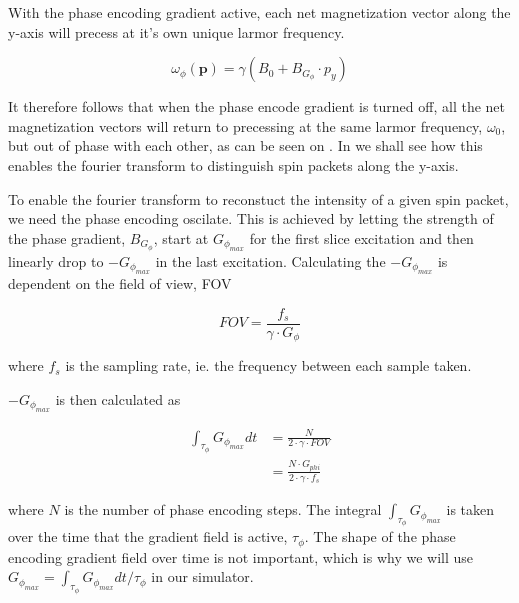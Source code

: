 With the phase encoding gradient active, each net magnetization vector
along the y-axis will precess at it's own unique larmor frequency. 

\begin{displaymath}
  \omega_\phi(\mathbf{p}) = \gamma (B_0 + B_{G_\phi} \cdot p_y)
\end{displaymath}

It therefore follows that when the phase encode gradient is turned
off, all the net magnetization vectors will return to precessing at
the same larmor frequency, $\omega_0$, but out of phase with each
other, as can be seen on . In
 we shall see how this enables the fourier
transform to distinguish spin packets along the y-axis.

To enable the fourier transform to reconstuct the intensity of a given
spin packet, we need the phase encoding oscilate. This is achieved by
letting the strength of the phase gradient, $B_{G_\phi}$, start at
$G_{\phi_{max}}$ for the first slice excitation and then linearly drop
to $-G_{\phi_{max}}$ in the last excitation. Calculating the
$-G_{\phi_{max}}$ is dependent on the field of view, FOV

\begin{displaymath}
  FOV = \frac{f_s}{\gamma \cdot G_{\phi}}
\end{displaymath}

where $f_s$ is the sampling rate, ie. the frequency between each
sample taken.

$-G_{\phi_{max}}$ is then calculated as

\begin{displaymath}
  \begin{array}{rl}
    \int_{\tau_\phi} G_{\phi_{max}} dt &= \frac{N}{2 \cdot \gamma \cdot FOV}\\
    &= \frac{N \cdot G_{phi}}{2 \cdot \gamma \cdot f_s}
  \end{array}
\end{displaymath}

where $N$ is the number of phase encoding steps. The integral
$\int_{\tau_\phi} G_{\phi_{max}}$ is taken over the time that the
gradient field is active, $\tau_\phi$. The shape of the phase encoding
gradient field over time is not important, which is why we will use
$G_{\phi_{max}} = \int_{\tau_\phi} G_{\phi_{max}} dt / \tau_\phi$ in our
simulator.




